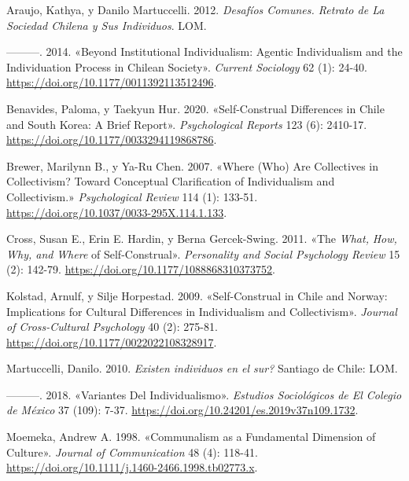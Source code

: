 \documentclass[
  letterpaper,
  DIV=11,
  numbers=noendperiod]{scrartcl}
\newlength{\cslhangindent}
\newenvironment{CSLReferences}[2] %
 {\begin{list}{}{%
  \setlength{\itemindent}{0pt}
  \setlength{\leftmargin}{0pt}
  \setlength{\parsep}{0pt}
  \ifodd #1
   \setlength{\leftmargin}{\cslhangindent}
   \setlength{\itemindent}{-1\cslhangindent}
  \fi
  \setlength{\itemsep}{#2\baselineskip}}}
 {\end{list}}
\begin{document}
\hfill\break

\label{refs}
\begin{CSLReferences}{1}{0}
Araujo, Kathya, y Danilo Martuccelli. 2012. \emph{Desaf{í}os {Comunes}.
{Retrato} de La Sociedad Chilena y Sus Individuos}. LOM.

---------. 2014. {«Beyond Institutional Individualism: {Agentic}
Individualism and the Individuation Process in {Chilean} Society»}.
\emph{Current Sociology} 62 (1): 24-40.
\url{https://doi.org/10.1177/0011392113512496}.

Benavides, Paloma, y Taekyun Hur. 2020. {«Self-{Construal Differences}
in {Chile} and {South Korea}: {A Brief Report}»}. \emph{Psychological
Reports} 123 (6): 2410-17.
\url{https://doi.org/10.1177/0033294119868786}.

Brewer, Marilynn B., y Ya-Ru Chen. 2007. {«Where ({Who}) {Are
Collectives} in {Collectivism}? {Toward Conceptual Clarification} of
{Individualism} and {Collectivism}.»} \emph{Psychological Review} 114
(1): 133-51. \url{https://doi.org/10.1037/0033-295X.114.1.133}.

Cross, Susan E., Erin E. Hardin, y Berna Gercek-Swing. 2011. {«The
{\emph{What}}{\emph{,} }{\emph{How}}{\emph{,} }{\emph{Why}}{\emph{, and}
}{\emph{Where}} of {Self-Construal}»}. \emph{Personality and Social
Psychology Review} 15 (2): 142-79.
\url{https://doi.org/10.1177/1088868310373752}.

Kolstad, Arnulf, y Silje Horpestad. 2009. {«Self-{Construal} in {Chile}
and {Norway}: {Implications} for {Cultural Differences} in
{Individualism} and {Collectivism}»}. \emph{Journal of Cross-Cultural
Psychology} 40 (2): 275-81.
\url{https://doi.org/10.1177/0022022108328917}.

Martuccelli, Danilo. 2010. \emph{{{\textquestiondown}Existen individuos
en el sur?}} Santiago de Chile: LOM.

---------. 2018. {«Variantes Del Individualismo»}. \emph{Estudios
Sociol{ó}gicos de El Colegio de M{é}xico} 37 (109): 7-37.
\url{https://doi.org/10.24201/es.2019v37n109.1732}.

Moemeka, Andrew A. 1998. {«Communalism as a {Fundamental Dimension} of
{Culture}»}. \emph{Journal of Communication} 48 (4): 118-41.
\url{https://doi.org/10.1111/j.1460-2466.1998.tb02773.x}.


\end{CSLReferences}
\end{document}
